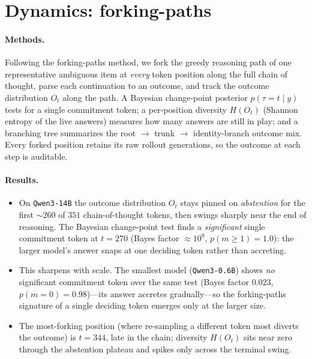 \section{Dynamics: forking-paths}
\label{app:dynamics}

\paragraph{Methods.}
Following the forking-paths method, we fork the greedy reasoning path of one
representative ambiguous item at \emph{every} token position along the full chain
of thought, parse each continuation to an outcome, and track the outcome
distribution $O_t$ along the path. A Bayesian change-point posterior
$p(\tau{=}t\mid y)$ tests for a single commitment token; a per-position diversity
$H(O_t)$ (Shannon entropy of the live answers) measures how many answers are still
in play; and a branching tree summarizes the root $\to$ trunk $\to$ identity-branch
outcome mix. Every forked position retains its raw rollout generations, so the
outcome at each step is auditable.

\paragraph{Results.}
\begin{itemize}[leftmargin=*,topsep=2pt,itemsep=1pt]
  \item On \texttt{Qwen3-14B} the outcome distribution $O_t$ stays pinned on
    \emph{abstention} for the first ${\sim}260$ of $351$ chain-of-thought tokens,
    then swings sharply near the end of reasoning. The Bayesian change-point test
    finds a \emph{significant} single commitment token at $t{=}270$ (Bayes factor
    ${\approx}10^{9}$, $p(m{\ge}1){=}1.0$): the larger model's answer snaps at one
    deciding token rather than accreting.
  \item This sharpens with scale. The smallest model (\texttt{Qwen3-0.6B}) shows
    \emph{no} significant commitment token over the same test (Bayes factor
    $0.023$, $p(m{=}0){=}0.98$)---its answer accretes gradually---so the
    forking-paths signature of a single deciding token emerges only at the larger
    size.
  \item The most-forking position (where re-sampling a different token most diverts
    the outcome) is $t{=}344$, late in the chain; diversity $H(O_t)$ sits near zero
    through the abstention plateau and spikes only across the terminal swing.
\end{itemize}

